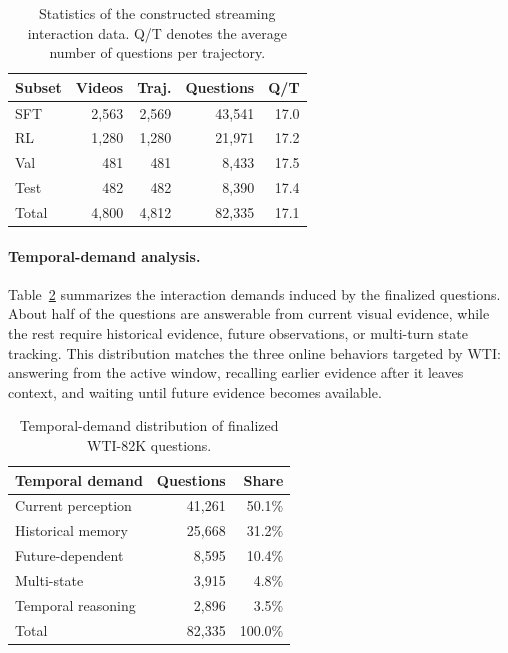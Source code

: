 \begin{table}[H]
  \centering
  \small
  \begin{tabular}{@{}lrrrr@{}}
    \hline
    Subset & Videos & Traj. & Questions & Q/T \\
    \hline
    SFT & 2,563 & 2,569 & 43,541 & 17.0 \\
    RL & 1,280 & 1,280 & 21,971 & 17.2 \\
    Val & 481 & 481 & 8,433 & 17.5 \\
    Test & 482 & 482 & 8,390 & 17.4 \\
    \hline
    \rowcolor{softblue}
    Total & 4,800 & 4,812 & 82,335 & 17.1 \\
    \hline
  \end{tabular}
  \caption{Statistics of the constructed streaming interaction data. Q/T denotes the average number of questions per trajectory.}
  \label{tab:data_stats}
\end{table}

\paragraph{Temporal-demand analysis.}
Table~\ref{tab:data_temporal_demand} summarizes the interaction demands induced by the finalized questions.
About half of the questions are answerable from current visual evidence, while the rest require historical evidence, future observations, or multi-turn state tracking.
This distribution matches the three online behaviors targeted by WTI: answering from the active window, recalling earlier evidence after it leaves context, and waiting until future evidence becomes available.

\begin{table}[H]
  \centering
  \small
  \begin{tabular}{@{}lrr@{}}
    \hline
    Temporal demand & Questions & Share \\
    \hline
    Current perception & 41,261 & 50.1\% \\
    Historical memory & 25,668 & 31.2\% \\
    Future-dependent & 8,595 & 10.4\% \\
    Multi-state & 3,915 & 4.8\% \\
    Temporal reasoning & 2,896 & 3.5\% \\
    \hline
    \rowcolor{softblue}
    Total & 82,335 & 100.0\% \\
    \hline
  \end{tabular}
  \caption{Temporal-demand distribution of finalized WTI-82K questions.}
  \label{tab:data_temporal_demand}
\end{table}

